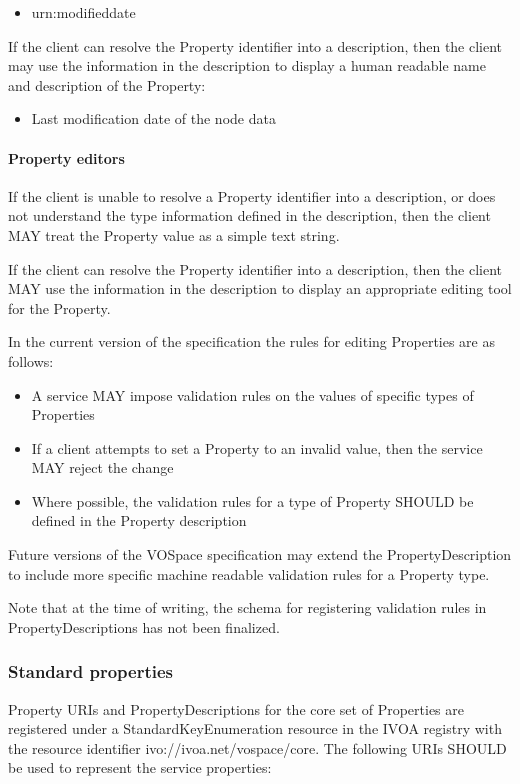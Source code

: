 \documentclass[11pt,a4paper]{ivoa}
\begin{document}
\begin{itemize}
    \item urn:modifieddate
\end{itemize}

If the client can resolve the Property identifier into a description, then the client may use the information in the description to display a human readable name and description of the Property:

\begin{itemize}
    \item Last modification date of the node data
\end{itemize}

\paragraph{Property editors}
If the client is unable to resolve a Property identifier into a description, or does not understand the type information defined in the description, then the client MAY treat the Property value as a simple text string.

If the client can resolve the Property identifier into a description, then the client MAY use the information in the description to display an appropriate editing tool for the Property.

In the current version of the specification the rules for editing Properties are as follows:

\begin{itemize}
    \item A service MAY impose validation rules on the values of specific types of Properties
    \item If a client attempts to set a Property to an invalid value, then the service MAY reject the change
    \item Where possible, the validation rules for a type of Property SHOULD be defined in the Property description
\end{itemize}

Future versions of the VOSpace specification may extend the PropertyDescription to include more specific machine readable validation rules for a Property type.

Note that at the time of writing, the schema for registering validation rules in PropertyDescriptions has not been finalized.

\subsubsection{Standard properties}
\label{subsubsec:standard properties}
Property URIs and PropertyDescriptions for the core set of Properties are registered under a StandardKeyEnumeration resource \citep{std:STDREGEXT} in the IVOA registry with the resource identifier ivo://ivoa.net/vospace/core. The following URIs SHOULD be used to represent the service properties:
\end{document}
